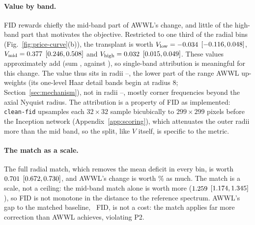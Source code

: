 
\paragraph{Value by band.}
FID rewards chiefly the mid-band part of AWWL's change, and little of the
high-band part that motivates the objective. Restricted to one third of the radial bins
(Fig.~\ref{fig:price-curve}(b)), the transplant is worth $V_{\mathrm{low}} = -0.034$
$[-0.116, 0.048]$,
$V_{\mathrm{mid}} = 0.377$
$[0.246, 0.508]$ and
$V_{\mathrm{high}} = 0.032$
$[0.015, 0.049]$. These values
approximately add (sum \priceTransplantBandSum, against
\priceTransplantValue), so single-band attribution is meaningful for this
change. The value thus sits in radii \bandMidMin--\bandMidMax, the lower part
of the range AWWL up-weights (its one-level Haar detail bands begin at
radius 8; Section~\ref{sec:mechanism}), not in radii
\bandHighMin--\bandHighMax, mostly corner frequencies beyond the axial
Nyquist radius. The attribution is a property of FID as implemented:
\texttt{clean-fid} upsamples each $32\times32$ sample bicubically to
$299\times299$ pixels before the Inception network
(Appendix~\ref{app:scoring}), which attenuates the outer radii more than the
mid band, so the split, like $V$ itself, is specific to the metric.

\paragraph{The match as a scale.}
\label{sec:second-operator}
The full radial match, which removes the mean deficit in every bin, is worth
$0.701$ $[0.672, 0.730]$, and AWWL's
change is worth \priceTransplantShareOfMatch\% as much. The match is a scale,
not a ceiling: the mid-band match alone is worth more
($1.259$ $[1.174, 1.345]$), so
FID is not monotone in the distance to the reference spectrum. AWWL's gap to
the matched baseline, \mrgMatch~FID, is not a cost: the match applies far more correction than
AWWL achieves, violating P2.

